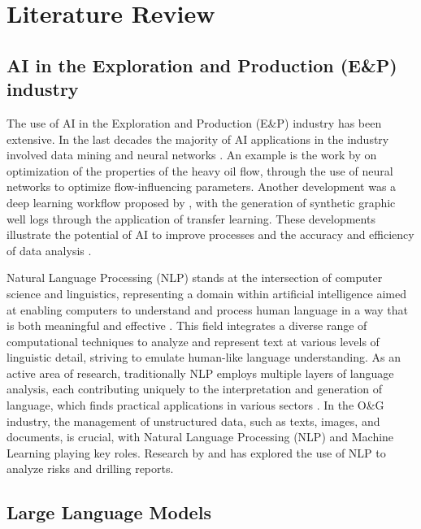    
\chapter{Literature Review} 




    \section{AI in the Exploration and Production (E\&P) industry}

        The use of AI in the Exploration and Production (E\&P) industry has been extensive. 
        In the last decades the majority of AI applications in the industry involved data mining and neural networks \citep{Bravo2014}. 
        An example is the work by \citep{Gudala2021} on optimization of the properties of the heavy oil flow, through the use of neural networks to optimize flow-influencing parameters.
        Another development was a deep learning workflow proposed by \citep{Gohari2024}, with the generation of synthetic graphic well logs through the application of transfer learning. 
        These developments illustrate the potential of AI to improve processes and the accuracy and efficiency of data analysis \citep{Rahmani2021}.
    
        Natural Language Processing (NLP) stands at the intersection of computer science and linguistics, representing a domain within artificial intelligence aimed at enabling computers to understand and process human language in a way that is both meaningful and effective \citep{Liddy2001}. 
        This field integrates a diverse range of computational techniques to analyze and represent text at various levels of linguistic detail, striving to emulate human-like language understanding. 
        As an active area of research, traditionally NLP employs multiple layers of language analysis, each contributing uniquely to the interpretation and generation of language, which finds practical applications in various sectors \citep{Liddy2001}.      
        In the O\&G industry, the management of unstructured data, such as texts, images, and documents, is crucial, with Natural Language Processing (NLP) and Machine Learning playing key roles.
        Research by \citet{Antoniak2016} and \citet{Castineira2018} has explored the use of NLP to analyze risks and drilling reports.           
    
    \section{Large Language Models}         

